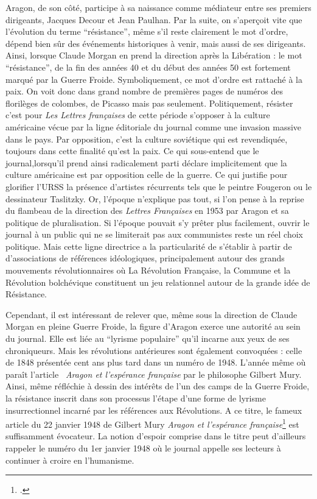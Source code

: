 	Aragon, de son côté, participe à sa naissance comme médiateur entre ses premiers dirigeants, Jacques Decour et Jean Paulhan. Par la suite, on s’aperçoit vite que l’évolution du terme \enquote{résistance}, même s’il reste clairement le mot d’ordre, dépend bien sûr des événements historiques à venir, mais aussi de ses dirigeants. Ainsi, lorsque Claude Morgan en prend la direction après la Libération : le mot \enquote{résistance}, de la fin des années 40 et du début des années 50 est  fortement marqué par la Guerre Froide. Symboliquement, ce mot d’ordre est rattaché à la paix. On voit donc dans grand nombre de premières pages de numéros des florilèges de colombes, de Picasso mais pas seulement. Politiquement, résister c’est pour \emph{Les Lettres françaises} de cette période s’opposer à la culture américaine vécue par la ligne éditoriale du journal comme une invasion massive dans le pays. Par opposition, c’est la culture soviétique qui est revendiquée, toujours dans cette finalité qu’est la paix. Ce qui sous-entend que le journal,lorsqu'il prend ainsi radicalement parti déclare implicitement que la culture américaine est par opposition celle de la guerre. Ce qui justifie pour glorifier l’URSS la présence d’artistes récurrents tels que le peintre Fougeron ou le dessinateur Taslitzky. Or, l’époque n’explique pas tout, si l'on pense à la reprise du flambeau de la direction des \emph{Lettres Françaises} en 1953 par Aragon et sa politique de pluralisation. Si l’époque pouvait s’y prêter plus facilement, ouvrir le journal à un public qui ne se limiterait pas aux communistes reste un réel choix politique. Mais cette ligne directrice a la particularité de s'établir à partir de d'associations de références idéologiques, principalement autour des grands mouvements révolutionnaires où La Révolution Française, la Commune et la Révolution bolchévique constituent un jeu relationnel autour de la grande idée de Résistance. 


Cependant, il est intéressant de relever que, même sous la direction de Claude Morgan en pleine Guerre Froide, la figure d’Aragon exerce une autorité au sein du journal. Elle est liée au \enquote{lyrisme populaire} qu’il incarne aux yeux de ses chroniqueurs. Mais les révolutions antérieures sont également convoquées : celle de 1848 présentée  cent ans plus tard dans un numéro de 1948. L’année même où paraît l’article  \emph{Aragon et l’espérance française} par le philosophe Gilbert Mury. Ainsi, même réfléchie à dessin des intérêts de l’un des camps de la Guerre Froide, la résistance inscrit dans son processus l’étape d’une forme de lyrisme insurrectionnel incarné par les références aux Révolutions. A ce titre, le fameux article du 22 janvier 1948 de Gilbert Mury \emph{Aragon et l’espérance française}\footcite{avantgarde} est suffisamment évocateur. La notion d’espoir comprise dans le titre peut d’ailleurs rappeler le numéro du 1er janvier 1948 où le journal appelle ses lecteurs à continuer à croire en l’humanisme. 


